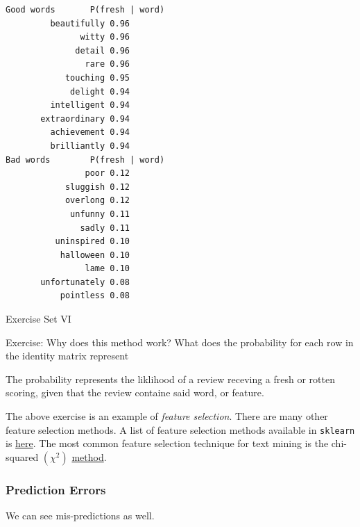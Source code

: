 \documentclass[11pt]{article}
\begin{document}
    \begin{Verbatim}[commandchars=\\\{\}]
Good words	     P(fresh | word)
         beautifully 0.96
               witty 0.96
              detail 0.96
                rare 0.96
            touching 0.95
             delight 0.94
         intelligent 0.94
       extraordinary 0.94
         achievement 0.94
         brilliantly 0.94
Bad words	     P(fresh | word)
                poor 0.12
            sluggish 0.12
            overlong 0.12
             unfunny 0.11
               sadly 0.11
          uninspired 0.10
           halloween 0.10
                lame 0.10
       unfortunately 0.08
           pointless 0.08

    \end{Verbatim}

    Exercise Set VI

Exercise: Why does this method work? What does the probability for each
row in the identity matrix represent

The probability represents the liklihood of a review receving a fresh or
rotten scoring, given that the review containe said word, or feature.

    The above exercise is an example of \emph{feature selection}. There are
many other feature selection methods. A list of feature selection
methods available in \texttt{sklearn} is
\href{http://scikit-learn.org/stable/modules/classes.html\#module-sklearn.feature_selection}{here}.
The most common feature selection technique for text mining is the
chi-squared \(\left( \chi^2 \right)\)
\href{http://nlp.stanford.edu/IR-book/html/htmledition/feature-selectionchi2-feature-selection-1.html}{method}.

    \subsubsection{Prediction Errors}\label{prediction-errors}

We can see mis-predictions as well.
\end{document}

